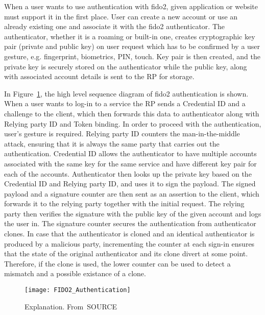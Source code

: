 When a user wants to use authentication with \acrshort{fido}2, given application or website must support it in the first place. User can create a new account or use an already existing one and associate it with the \acrshort{fido}2 authenticator. The authenticator, whether it is a roaming or built-in one, creates cryptographic key pair (private and public key) on user request which has to be confirmed by a user gesture, e.g. fingerprint, biometrics, PIN, touch. Key pair is then created, and the private key is securely stored on the authenticator while the public key, along with associated account details is sent to the RP for storage.

In Figure~\ref{fig:fido2_authentication}, the high level sequence diagram of \acrshort{fido}2 authentication is shown. When a user wants to log-in to a service the RP sends a Credential ID and a challenge to the client, which then forwards this data to authenticator along with Relying party ID and Token binding. In order to proceed with the authentication, user's gesture is required. Relying party ID counters the man-in-the-middle attack, ensuring that it is always the same party that carries out the authentication. Credential ID allows the authenticator to have multiple accounts associated with the same key for the same service and have different key pair for each of the accounts. Authenticator then looks up the private key based on the Credential ID and Relying party ID, and uses it to sign the payload. The signed payload and a signature counter are then sent as an assertion to the client, which forwards it to the relying party together with the initial request. The relying party then verifies the signature with the public key of the given account and logs the user in. The signature counter secures the authentication from authenticator clones. In case that the authenticator is cloned and an identical authenticator is produced by a malicious party, incrementing the counter at each sign-in ensures that the state of the original authenticator and its clone divert at some point. Therefore, if the clone is used, the lower counter can be used to detect a mismatch and a possible existance of a clone.

\begin{figure}[ht]
    \centering
    \texttt{[image: FIDO2\_Authentication]}
    \caption{Explanation. From~\cite{}SOURCE}
    \label{fig:fido2_authentication}
\end{figure}
